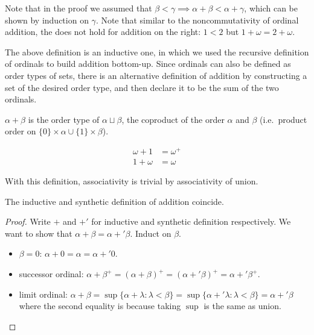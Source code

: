 \documentclass[a4paper]{article}
\begin{document}
Note that in the proof we assumed that \(\beta < \gamma \implies \alpha + \beta < \alpha + \gamma\), which can be shown by induction on \(\gamma\). Note that similar to the noncommutativity of ordinal addition, the does not hold for addition on the right: \(1 < 2\) but \(1 + \omega = 2 + \omega\).

The above definition is an inductive one, in which we used the recursive definition of ordinals to build addition bottom-up. Since ordinals can also be defined as order types of sets, there is an alternative definition of addition by constructing a set of the desired order type, and then declare it to be the sum of the two ordinals.

\begin{definition}
  \(\alpha + \beta\) is the order type of \(\alpha \sqcup \beta\), the coproduct of the order \(\alpha\) and \(\beta\) (i.e.\ product order on \(\{0\} \times \alpha \cup \{1\} \times \beta\)).
\end{definition}

\begin{eg}
  \begin{align*}
    \omega + 1 &= \omega^+ \\
    1 + \omega &= \omega
  \end{align*}
\end{eg}

With this definition, associativity is trivial by associativity of union.

\begin{proposition}
  The inductive and synthetic definition of addition coincide.
\end{proposition}

\begin{proof}
  Write \(+\) and \(+'\) for inductive and synthetic definition respectively. We want to show that \(\alpha + \beta = \alpha +' \beta\). Induct on \(\beta\).
  \begin{itemize}
  \item \(\beta = 0\): \(\alpha + 0 = \alpha = \alpha +' 0\).
  \item successor ordinal: \(\alpha + \beta^+ = (\alpha + \beta)^+ = (\alpha +' \beta)^+ = \alpha +' \beta^+\).
  \item limit ordinal: \(\alpha + \beta = \sup \{\alpha + \lambda: \lambda < \beta\} = \sup \{\alpha +' \lambda: \lambda < \beta\} = \alpha +' \beta\) where the second equality is because taking \(\sup\) is the same as union.
  \end{itemize}
\end{proof}
\end{document}
